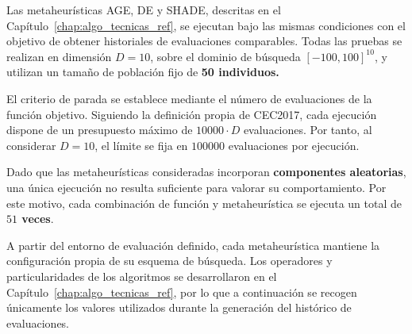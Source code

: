 



Las metaheurísticas AGE, DE y SHADE, descritas en el
Capítulo~\ref{chap:algo_tecnicas_ref}, se ejecutan bajo las mismas condiciones
con el objetivo de obtener historiales de evaluaciones comparables. Todas las pruebas
se realizan en dimensión \(D=10\), sobre el dominio de búsqueda
\([-100,100]^{10}\), y utilizan un tamaño de población fijo de \textbf{50 individuos.}

El criterio de parada se establece mediante el número de evaluaciones de la
función objetivo. Siguiendo la definición propia de CEC2017, cada ejecución
dispone de un presupuesto máximo de \(10000 \cdot D\) evaluaciones. Por tanto,
al considerar \(D=10\), el límite se fija en \(100000\) evaluaciones por
ejecución.

Dado que las metaheurísticas consideradas incorporan \textbf{componentes aleatorias}, una única ejecución no resulta suficiente para valorar su comportamiento. Por este motivo, cada combinación de función y metaheurística se ejecuta un total de \textbf{\(51\) veces}.



A partir del entorno de evaluación definido, cada metaheurística mantiene la
configuración propia de su esquema de búsqueda. Los operadores y particularidades de los
algoritmos se desarrollaron en el Capítulo~\ref{chap:algo_tecnicas_ref}, por lo
que a continuación se recogen únicamente los valores utilizados durante la
generación del histórico de evaluaciones.

